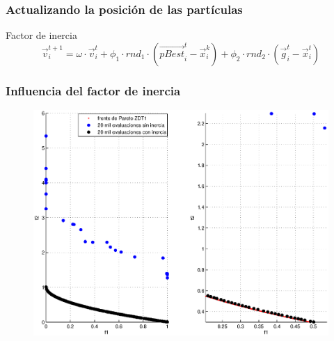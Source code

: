 \documentclass[10pt,compress]{beamer}
\begin{document}
\begin{frame}
	\frametitle{Actualizando la posici\'on de las part\'iculas}
		\begin{block}{Factor de inercia}
		\[  
		\vec{v}^{t+1}_{i} = \omega \cdot \vec{v}^t_i + \phi_1 \cdot rnd_1 \cdot \left(\vec{pBest}^t_i - \vec{x}^k_i \right) 
					    + \phi_2 \cdot rnd_2 \cdot \left(\vec{g}^t_i - \vec{x}^t_i \right) 
     \]
  \end{block}
\end{frame}
\begin{frame}
	\frametitle{Influencia del factor de inercia}	
	\begin{figure}[H]
	\centering
	\includegraphics[scale=0.4]{zdt1inercia.eps}
      
      \end{figure}
\end{frame}
\end{document}
